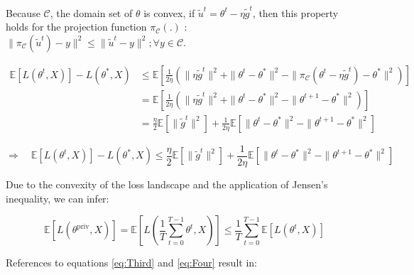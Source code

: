 \documentclass[12pt]{extarticle}
\begin{document}
Because $\mathcal{C}$, the domain set of $\theta$ is convex, if $\tilde{u}^{t} = \theta^{t} - \eta \tilde{g}^{t}$, then this property holds for the projection function $\pi_\mathcal{C}(.)$ : $\|\pi_\mathcal{C}(\tilde{u}^{t})-y\|^2 \le \|\tilde{u}^{t}-y\|^2  ; \forall y \in \mathcal{C}$.

\begin{align*}
	\mathbb{E}[L(\theta^t, X)] -  L(\theta^{*}, X) &\leq \mathbb{E}\left[\frac{1}{2\eta}\left(\|\eta \tilde{g}^{t}\|^2 + \|\theta^{t} - \theta^{*}\|^2 - \|\pi_\mathcal{C}(\theta^{t}-\eta \tilde{g}^{t}) - \theta^{*}\|^2\right)\right]\\
	& = \mathbb{E}\left[\frac{1}{2\eta}\left(\|\eta \tilde{g}^{t}\|^2 + \|\theta^{t} - \theta^{*}\|^2 - \|\theta^{t+1} - \theta^{*}\|^2\right)\right]\\
	& = \frac{\eta}{2}\mathbb{E}[\|\tilde{g}^{t}\|^2]+\frac{1}{2\eta}\mathbb{E} [\|\theta^{t} - \theta^{*}\|^2-\|\theta^{t+1} - \theta^{*}\|^2]
\end{align*}

\begin{equation}
	\Rightarrow\quad \mathbb{E}[L(\theta^t, X)] - L(\theta^{*}, X) \leq \frac{\eta}{2}\mathbb{E}[\|\tilde{g}^{t}\|^2] + \frac{1}{2\eta}\mathbb{E} [\|\theta^{t} - \theta^{*}\|^2 - \|\theta^{t+1} - \theta^{*}\|^2]\label{eq:Third}
\end{equation}

Due to the convexity of the loss landscape and the application of Jensen's inequality, we can infer:

\begin{equation}
	\mathbb{E}[L(\theta^\text{priv}, X)] = \mathbb{E}[L(\frac{1}{T} \sum_{t=0}^{T-1} \theta^t, X)] \le \frac{1}{T} \sum_{t=0}^{T-1}\mathbb{E}[L(\theta^t, X)] \label{eq:Four}
\end{equation}

References to equations \ref{eq:Third} and \ref{eq:Four} result in:
\end{document}
